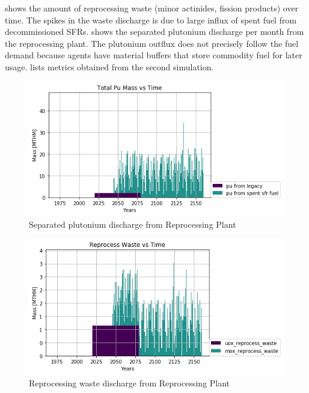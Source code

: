 	 shows the amount of reprocessing waste
	(minor actinides, fission products) over time. The spikes in the 
	waste discharge is due to large influx of spent fuel from
	decommissioned \glspl{SFR}. shows the separated plutonium discharge
	per month from the reprocessing plant. The plutonium outflux
	does not precisely follow the fuel demand because \Cyclus agents have
	material buffers that store commodity fuel for later usage. 
	 lists metrics obtained from the second simulation.
	
	\begin{figure}[htbp!]
		\begin{center}
			\includegraphics[width=\columnwidth]{./images/french-transition/pu.png}
		\end{center}
		\caption{Separated plutonium discharge from Reprocessing Plant}
		\label{fig:pu_no_cum}
	\end{figure}
	
	
	\begin{figure}[htbp!]
		\begin{center}
			\includegraphics[width=\columnwidth]{./images/french-transition/reprocess_waste.png}
		\end{center}
		\caption{Reprocessing waste discharge from Reprocessing Plant}
		\label{fig:reprocess_waste}
	\end{figure}
	
